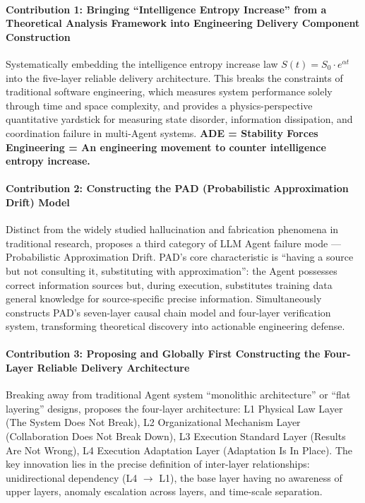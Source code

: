 \documentclass[11pt,a4paper]{article}
\begin{document}
\paragraph{Contribution 1: Bringing ``Intelligence Entropy Increase'' from a Theoretical Analysis Framework into Engineering Delivery Component Construction}
Systematically embedding the intelligence entropy increase law $S(t) = S_0 \cdot e^{\alpha t}$ into the five-layer reliable delivery architecture. This breaks the constraints of traditional software engineering, which measures system performance solely through time and space complexity, and provides a physics-perspective quantitative yardstick for measuring state disorder, information dissipation, and coordination failure in multi-Agent systems. \textbf{ADE = Stability Forces Engineering = An engineering movement to counter intelligence entropy increase.}

\paragraph{Contribution 2: Constructing the PAD (Probabilistic Approximation Drift) Model}
Distinct from the widely studied hallucination and fabrication phenomena in traditional research, proposes a third category of LLM Agent failure mode --- Probabilistic Approximation Drift. PAD's core characteristic is ``having a source but not consulting it, substituting with approximation'': the Agent possesses correct information sources but, during execution, substitutes training data general knowledge for source-specific precise information. Simultaneously constructs PAD's seven-layer causal chain model and four-layer verification system, transforming theoretical discovery into actionable engineering defense.

\paragraph{Contribution 3: Proposing and Globally First Constructing the Four-Layer Reliable Delivery Architecture}
Breaking away from traditional Agent system ``monolithic architecture'' or ``flat layering'' designs, proposes the four-layer architecture: L1 Physical Law Layer (The System Does Not Break), L2 Organizational Mechanism Layer (Collaboration Does Not Break Down), L3 Execution Standard Layer (Results Are Not Wrong), L4 Execution Adaptation Layer (Adaptation Is In Place). The key innovation lies in the precise definition of inter-layer relationships: unidirectional dependency (L4 $\rightarrow$ L1), the base layer having no awareness of upper layers, anomaly escalation across layers, and time-scale separation.
\end{document}
